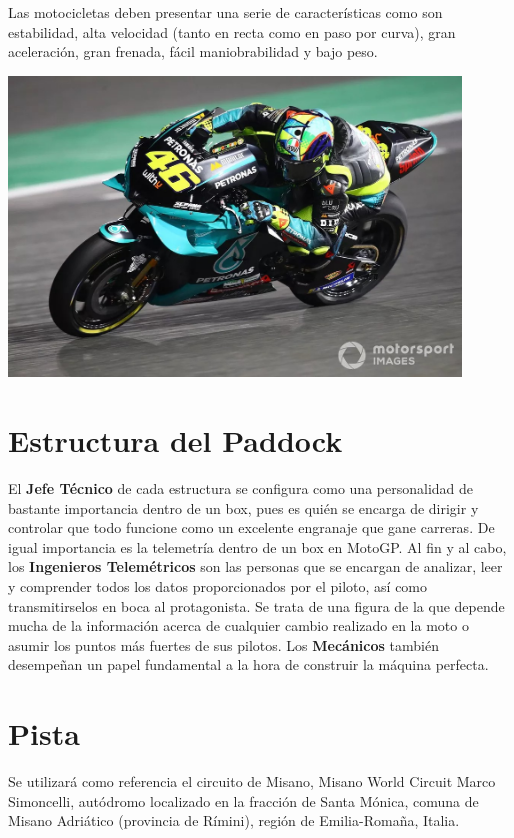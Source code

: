 \documentclass[12pt, letterpaper,spanish]{article}
\theoremstyle{definition}
\theoremstyle{remark}
\begin{document}
	Las motocicletas deben presentar una serie de características como son estabilidad, alta velocidad (tanto en recta como en paso por curva), gran aceleración, gran frenada, fácil maniobrabilidad y bajo peso.
	
	\begin{center}
		\includegraphics[width = 12cm]{imagen1} 
	\end{center}	
	
\section{Estructura del Paddock}
	El \textbf{Jefe Técnico} de cada estructura se configura como una personalidad de bastante importancia dentro de un box, pues es quién se encarga de dirigir y controlar que todo funcione como un excelente engranaje que gane carreras. De igual importancia es la telemetría dentro de un box en MotoGP. Al fin y al cabo, los \textbf{Ingenieros Telemétricos} son las personas que se encargan de analizar, leer y comprender todos los datos proporcionados por el piloto, así como transmitirselos en boca al protagonista. Se trata de una figura de la que depende mucha de la información acerca de cualquier cambio realizado en la moto o asumir los puntos más fuertes de sus pilotos. Los \textbf{Mecánicos} también desempeñan un papel fundamental a la hora de construir la máquina perfecta.

\section{Pista}
	Se utilizará como referencia el circuito de Misano, Misano World Circuit Marco Simoncelli, autódromo localizado en la fracción de Santa Mónica, comuna de Misano Adriático (provincia de Rímini), región de Emilia-Romaña, Italia. 
	
\end{document}

